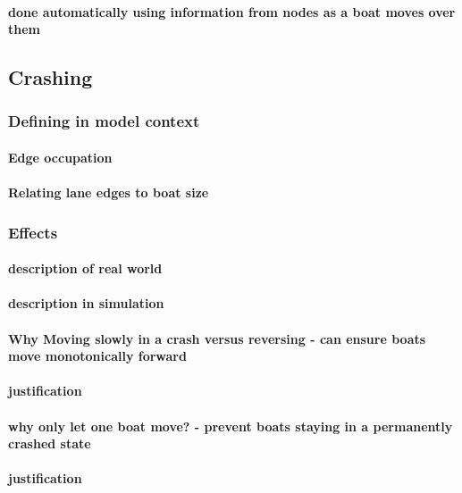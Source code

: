       \paragraph{done automatically using information from nodes as a boat moves over them}
    \subsection{Crashing}\label{model:movement:crashing}
      \subsubsection{Defining in model context}
        \paragraph{Edge occupation}
        \paragraph{Relating lane edges to boat size}
      \subsubsection{Effects}
        \paragraph{description of real world}
        \paragraph{description in simulation}
        \paragraph{Why Moving slowly in a crash versus reversing - can ensure boats move monotonically forward}
        \paragraph{justification}
        \paragraph{why only let one boat move? - prevent boats staying in a permanently crashed state}
        \paragraph{justification}
  

